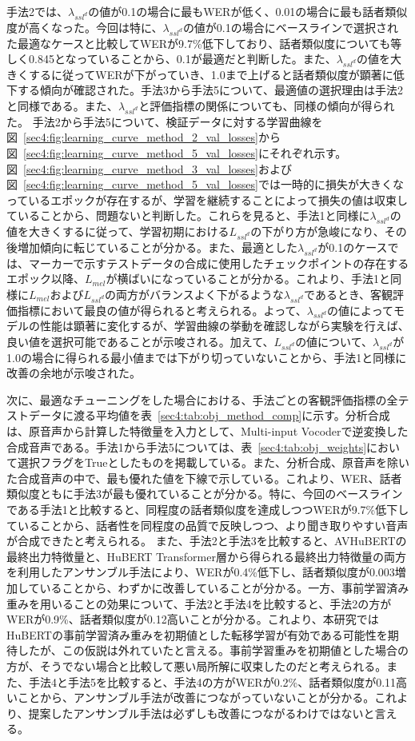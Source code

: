 \documentclass[12pt]{jarticle}
\numberwithin{equation}{section}    %
\numberwithin{figure}{section}      %
\numberwithin{table}{section}      %
\begin{document}
手法2では、$\lambda_{ssl^{d}}$の値が0.1の場合に最もWERが低く、0.01の場合に最も話者類似度が高くなった。今回は特に、$\lambda_{ssl^{d}}$の値が0.1の場合にベースラインで選択された最適なケースと比較してWERが9.7\%低下しており、話者類似度についても等しく0.845となっていることから、0.1が最適だと判断した。また、$\lambda_{ssl^{d}}$の値を大きくするに従ってWERが下がっていき、1.0まで上げると話者類似度が顕著に低下する傾向が確認された。手法3から手法5について、最適値の選択理由は手法2と同様である。また、$\lambda_{ssl^{d}}$と評価指標の関係についても、同様の傾向が得られた。
手法2から手法5について、検証データに対する学習曲線を図~\ref{sec4:fig:learning_curve_method_2_val_losses}から図~\ref{sec4:fig:learning_curve_method_5_val_losses}にそれぞれ示す。図~\ref{sec4:fig:learning_curve_method_3_val_losses}および図~\ref{sec4:fig:learning_curve_method_5_val_losses}では一時的に損失が大きくなっているエポックが存在するが、学習を継続することによって損失の値は収束していることから、問題ないと判断した。これらを見ると、手法1と同様に$\lambda_{ssl^{d}}$の値を大きくするに従って、学習初期における$L_{ssl^{d}}$の下がり方が急峻になり、その後増加傾向に転じていることが分かる。また、最適とした$\lambda_{ssl^{d}}$が0.1のケースでは、マーカーで示すテストデータの合成に使用したチェックポイントの存在するエポック以降、$L_{mel}$が横ばいになっていることが分かる。これより、手法1と同様に$L_{mel}$および$L_{ssl^{d}}$の両方がバランスよく下がるような$\lambda_{ssl^{d}}$であるとき、客観評価指標において最良の値が得られると考えられる。よって、$\lambda_{ssl^{d}}$の値によってモデルの性能は顕著に変化するが、学習曲線の挙動を確認しながら実験を行えば、良い値を選択可能であることが示唆される。加えて、$L_{ssl^{d}}$の値について、$\lambda_{ssl^{d}}$が1.0の場合に得られる最小値までは下がり切っていないことから、手法1と同様に改善の余地が示唆された。

次に、最適なチューニングをした場合における、手法ごとの客観評価指標の全テストデータに渡る平均値を表~\ref{sec4:tab:obj_method_comp}に示す。分析合成は、原音声から計算した特徴量を入力として、Multi-input Vocoderで逆変換した合成音声である。手法1から手法5については、表~\ref{sec4:tab:obj_weights}において選択フラグをTrueとしたものを掲載している。また、分析合成、原音声を除いた合成音声の中で、最も優れた値を下線で示している。これより、WER、話者類似度ともに手法3が最も優れていることが分かる。特に、今回のベースラインである手法1と比較すると、同程度の話者類似度を達成しつつWERが9.7\%低下していることから、話者性を同程度の品質で反映しつつ、より聞き取りやすい音声が合成できたと考えられる。
また、手法2と手法3を比較すると、AVHuBERTの最終出力特徴量と、HuBERT Transformer層から得られる最終出力特徴量の両方を利用したアンサンブル手法により、WERが0.4\%低下し、話者類似度が0.003増加していることから、わずかに改善していることが分かる。一方、事前学習済み重みを用いることの効果について、手法2と手法4を比較すると、手法2の方がWERが0.9\%、話者類似度が0.12高いことが分かる。これより、本研究ではHuBERTの事前学習済み重みを初期値とした転移学習が有効である可能性を期待したが、この仮説は外れていたと言える。事前学習重みを初期値とした場合の方が、そうでない場合と比較して悪い局所解に収束したのだと考えられる。また、手法4と手法5を比較すると、手法4の方がWERが0.2\%、話者類似度が0.11高いことから、アンサンブル手法が改善につながっていないことが分かる。これより、提案したアンサンブル手法は必ずしも改善につながるわけではないと言える。
\end{document}
